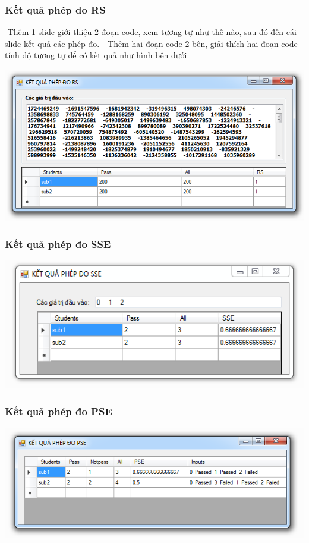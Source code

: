 \documentclass{beamer}
\begin{document}
\begin{frame}
  \frametitle{Kết quả phép đo RS}
  -Thêm 1 slide giới thiệu 2 đoạn code, xem tương tự như thế nào, sau đó đến cái slide kết quả các phép đo.
  - Thêm hai đoạn code 2 bên, giải thích hai đoạn code tính độ tương tự để có kết quả như hình bên dưới
  
  \centering \includegraphics[width=0.8\linewidth]{images/kq_rs.png}
\end{frame}

\begin{frame}
\frametitle{Kết quả phép đo SSE}
\centering
\includegraphics[width=0.8\linewidth]{images/kq_sse.png} 
\end{frame}

\begin{frame}
\frametitle{Kết quả phép đo PSE}
\centering
\includegraphics[width=0.8\linewidth]{images/kq_pse.png}
\end{frame}
\end{document}
